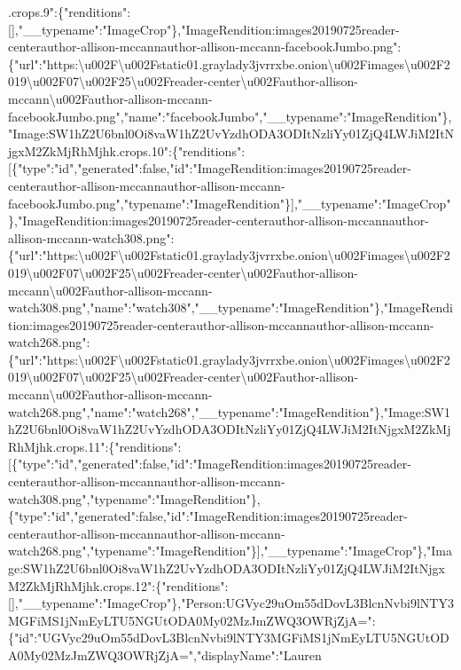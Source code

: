 .crops.9":\{"renditions":{[}{]},"\_\_typename":"ImageCrop"\},"ImageRendition:images20190725reader-centerauthor-allison-mccannauthor-allison-mccann-facebookJumbo.png":\{"url":"https:\textbackslash{}u002F\textbackslash{}u002Fstatic01.graylady3jvrrxbe.onion\textbackslash{}u002Fimages\textbackslash{}u002F2019\textbackslash{}u002F07\textbackslash{}u002F25\textbackslash{}u002Freader-center\textbackslash{}u002Fauthor-allison-mccann\textbackslash{}u002Fauthor-allison-mccann-facebookJumbo.png","name":"facebookJumbo","\_\_typename":"ImageRendition"\},"Image:SW1hZ2U6bnl0Oi8vaW1hZ2UvYzdhODA3ODItNzliYy01ZjQ4LWJiM2ItNjgxM2ZkMjRhMjhk.crops.10":\{"renditions":{[}\{"type":"id","generated":false,"id":"ImageRendition:images20190725reader-centerauthor-allison-mccannauthor-allison-mccann-facebookJumbo.png","typename":"ImageRendition"\}{]},"\_\_typename":"ImageCrop"\},"ImageRendition:images20190725reader-centerauthor-allison-mccannauthor-allison-mccann-watch308.png":\{"url":"https:\textbackslash{}u002F\textbackslash{}u002Fstatic01.graylady3jvrrxbe.onion\textbackslash{}u002Fimages\textbackslash{}u002F2019\textbackslash{}u002F07\textbackslash{}u002F25\textbackslash{}u002Freader-center\textbackslash{}u002Fauthor-allison-mccann\textbackslash{}u002Fauthor-allison-mccann-watch308.png","name":"watch308","\_\_typename":"ImageRendition"\},"ImageRendition:images20190725reader-centerauthor-allison-mccannauthor-allison-mccann-watch268.png":\{"url":"https:\textbackslash{}u002F\textbackslash{}u002Fstatic01.graylady3jvrrxbe.onion\textbackslash{}u002Fimages\textbackslash{}u002F2019\textbackslash{}u002F07\textbackslash{}u002F25\textbackslash{}u002Freader-center\textbackslash{}u002Fauthor-allison-mccann\textbackslash{}u002Fauthor-allison-mccann-watch268.png","name":"watch268","\_\_typename":"ImageRendition"\},"Image:SW1hZ2U6bnl0Oi8vaW1hZ2UvYzdhODA3ODItNzliYy01ZjQ4LWJiM2ItNjgxM2ZkMjRhMjhk.crops.11":\{"renditions":{[}\{"type":"id","generated":false,"id":"ImageRendition:images20190725reader-centerauthor-allison-mccannauthor-allison-mccann-watch308.png","typename":"ImageRendition"\},\{"type":"id","generated":false,"id":"ImageRendition:images20190725reader-centerauthor-allison-mccannauthor-allison-mccann-watch268.png","typename":"ImageRendition"\}{]},"\_\_typename":"ImageCrop"\},"Image:SW1hZ2U6bnl0Oi8vaW1hZ2UvYzdhODA3ODItNzliYy01ZjQ4LWJiM2ItNjgxM2ZkMjRhMjhk.crops.12":\{"renditions":{[}{]},"\_\_typename":"ImageCrop"\},"Person:UGVyc29uOm55dDovL3BlcnNvbi9lNTY3MGFiMS1jNmEyLTU5NGUtODA0My02MzJmZWQ3OWRjZjA=":\{"id":"UGVyc29uOm55dDovL3BlcnNvbi9lNTY3MGFiMS1jNmEyLTU5NGUtODA0My02MzJmZWQ3OWRjZjA=","displayName":"Lauren
